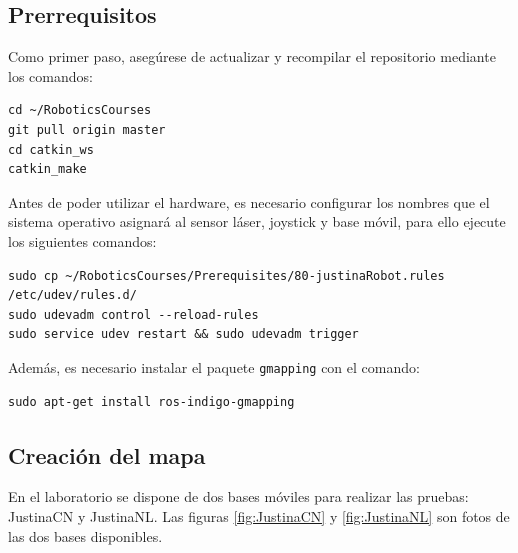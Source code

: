 \documentclass[letterpaper,12pt]{article}
\begin{document}
\subsection{Prerrequisitos}
Como primer paso, asegúrese de actualizar y recompilar el repositorio mediante los comandos:
\begin{verbatim}
cd ~/RoboticsCourses
git pull origin master
cd catkin_ws
catkin_make
\end{verbatim}

Antes de poder utilizar el hardware, es necesario configurar los nombres que el sistema operativo asignará al sensor láser, joystick y base móvil, para ello ejecute los siguientes comandos:
\begin{verbatim}
sudo cp ~/RoboticsCourses/Prerequisites/80-justinaRobot.rules /etc/udev/rules.d/
sudo udevadm control --reload-rules
sudo service udev restart && sudo udevadm trigger
\end{verbatim}

Además, es necesario instalar el paquete \texttt{gmapping} con el comando:
\begin{verbatim}
sudo apt-get install ros-indigo-gmapping
\end{verbatim}

\subsection{Creación del mapa}
En el laboratorio se dispone de dos bases móviles para realizar las pruebas: JustinaCN y JustinaNL. Las figuras \ref{fig:JustinaCN} y 
\ref{fig:JustinaNL} son fotos de las dos bases disponibles. 
\end{document}
